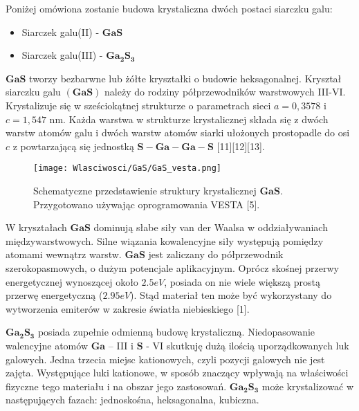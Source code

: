 Poniżej omówiona zostanie budowa krystaliczna dwóch postaci siarczku galu:
\begin{itemize}
	\item Siarczek galu(II) - $\mathbf{GaS}$
	\item Siarczek galu(III) - $\mathbf{Ga_{2}S_{3}}$
\end{itemize}
$\mathbf{GaS}$ tworzy bezbarwne lub żółte kryształki o budowie heksagonalnej. Kryształ siarczku galu $\mathbf{(GaS)}$ należy do rodziny półprzewodników warstwowych III-VI. Krystalizuje się w sześciokątnej strukturze o parametrach sieci $a = 0,3578$ i $c = 1,547$ nm. Każda warstwa w strukturze krystalicznej składa się z dwóch warstw atomów galu i dwóch warstw atomów siarki ułożonych prostopadle do osi $c$ z powtarzającą się jednostką $\mathbf{S-Ga-Ga-S}$ [11][12][13].
\begin{figure}[H]
	\begin{center}
		\texttt{[image: Wlasciwosci/GaS/GaS\_vesta.png]}
		\caption{Schematyczne przedstawienie struktury krystalicznej $\mathbf{GaS}$. Przygotowano używając oprogramowania VESTA [5].}
	\end{center}
\end{figure}

W kryształach $\mathbf{GaS}$ dominują słabe siły van der Waalsa w oddziaływaniach międzywarstwowych. Silne wiązania kowalencyjne siły występują pomiędzy atomami wewnątrz warstw.
$\mathbf{GaS}$ jest zaliczany do półprzewodnik szerokopasmowych, o dużym potencjale aplikacyjnym. Oprócz skośnej przerwy energetycznej wynoszącej około $2.5eV$, posiada on nie wiele większą prostą przerwę energetyczną ($2.95eV$). Stąd materiał ten może być wykorzystany do wytworzenia emiterów w zakresie światła niebieskiego [1].

$\mathbf{Ga_{2}S_{3}}$ posiada zupełnie odmienną budowę krystaliczną. Niedopasowanie walencyjne atomów $\mathbf{Ga}$ – III i $\mathbf{S}$ - VI skutkuję dużą ilością uporządkowanych luk galowych. Jedna trzecia miejsc kationowych, czyli pozycji galowych nie jest zajęta. Występujące luki kationowe, w sposób znaczący wpływają na właściwości fizyczne tego materiału i na obszar jego zastosowań. $\mathbf{Ga_{2}S_{3}}$ może krystalizować w następujących fazach: jednoskośna, heksagonalna, kubiczna.

